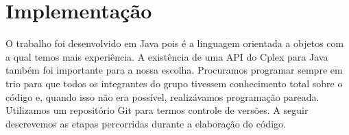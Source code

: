 
\section{Implementação}
\label{sec:implementacao}

O trabalho foi desenvolvido em Java pois é a linguagem orientada a objetos com a qual temos mais
experiência. A existência de uma API do Cplex para Java também foi importante para a nossa escolha.
Procuramos programar sempre em trio para que todos os integrantes do grupo tivessem conhecimento
total sobre o código e, quando isso não era possível, realizávamos programação pareada. Utilizamos
um repositório Git para termos controle de versões. A seguir descrevemos as etapas percorridas 
durante a elaboração do código.

